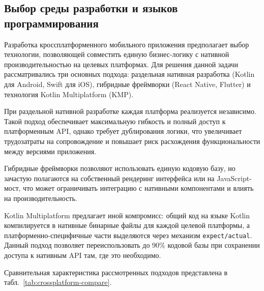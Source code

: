 \documentclass[../main.tex]{subfiles}
\begin{document}
\subsection{Выбор среды разработки и языков программирования}

Разработка кроссплатформенного мобильного приложения предполагает выбор технологии, позволяющей совместить единую бизнес-логику с нативной производительностью на целевых платформах. Для решения данной задачи рассматривались три основных подхода: раздельная нативная разработка (Kotlin для Android, Swift для iOS), гибридные фреймворки (React Native, Flutter) и технология Kotlin Multiplatform (KMP).

При раздельной нативной разработке каждая платформа реализуется независимо. Такой подход обеспечивает максимальную гибкость и полный доступ к платформенным API, однако требует дублирования логики, что увеличивает трудозатраты на сопровождение и повышает риск расхождения функциональности между версиями приложения.

Гибридные фреймворки позволяют использовать единую кодовую базу, но зачастую полагаются на собственный рендеринг интерфейса или на JavaScript-мост, что может ограничивать интеграцию с нативными компонентами и влиять на производительность.

Kotlin Multiplatform предлагает иной компромисс: общий код на языке Kotlin компилируется в нативные бинарные файлы для каждой целевой платформы, а платформенно-специфичные части выделяются через механизм \texttt{expect/actual}. Данный подход позволяет переиспользовать до 90\% кодовой базы при сохранении доступа к нативным API там, где это необходимо.

Сравнительная характеристика рассмотренных подходов представлена в табл.~\ref{tab:crossplatform-compare}.
\end{document}
